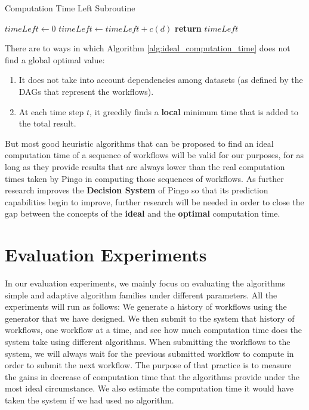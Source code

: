 \begin{algorithm}
\begin{singlespace}
\caption{Computation Time Left Subroutine}
\label{alg:computation_time_left}
\begin{algorithmic}[1]
	\State $timeLeft \gets 0$
			\State $timeLeft \gets timeLeft + c(d)$
		\EndIf
	\EndFor
	\State \textbf{return} $timeLeft$
\EndProcedure
\end{algorithmic}
\end{singlespace}
\end{algorithm}

There are to ways in which Algorithm \ref{alg:ideal_computation_time} does not find a global optimal value:
\begin{enumerate}
\item It does not take into account dependencies among datasets (as defined by the DAGs that represent the workflows).
\item At each time step $t$, it greedily finds a \textbf{local} minimum time that is added to the total result.
\end{enumerate}

But most good heuristic algorithms that can be proposed to find an ideal computation time of a sequence of workflows will be valid for our purposes, for as long as they provide results that are always lower than the real computation times taken by Pingo in computing those sequences of workflows.  As further research improves the \textbf{Decision System} of Pingo so that its prediction capabilities begin to improve, further research will be needed in order to close the gap between the concepts of the \textbf{ideal} and the \textbf{optimal} computation time.
\section{Evaluation Experiments}
In our evaluation experiments, we mainly focus on evaluating the algorithms simple and adaptive algorithm families under different parameters.  All the experiments will run as follows: We generate a history of workflows using the generator that we have designed.  We then submit to the system that history of workflows, one workflow at a time, and see how much computation time does the system take using different algorithms. When submitting the workflows to the system, we will always wait for the previous submitted workflow to compute in order to submit the next workflow. The purpose of that practice is to measure the gains in decrease of computation time that the algorithms provide under the most ideal circumstance. We also estimate the computation time it would have taken the system if we had used no algorithm.

